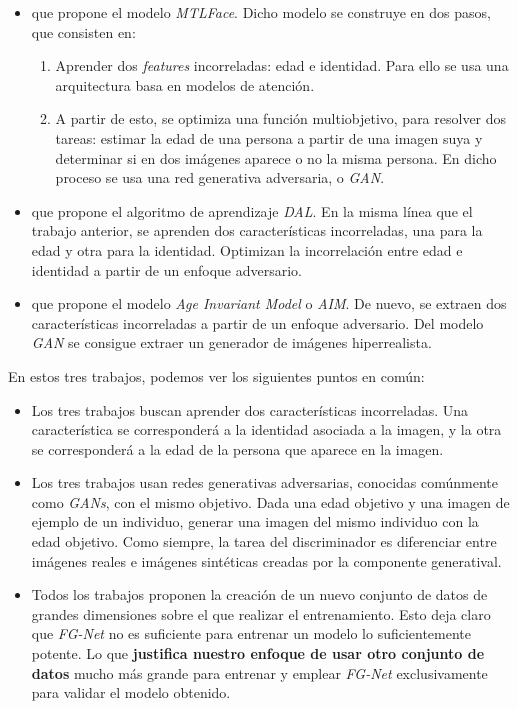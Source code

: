 \begin{itemize}
	\item {} \cite{informatica:best_fgnet_model} que propone el modelo \textit{MTLFace}. Dicho modelo se construye en dos pasos, que consisten en:
	      \begin{enumerate}
		      \item Aprender dos \textit{features} incorreladas: edad e identidad. Para ello se usa una arquitectura basa en modelos de atención.
		      \item A partir de esto, se optimiza una función multiobjetivo, para resolver dos tareas: estimar la edad de una persona a partir de una imagen suya y determinar si en dos imágenes aparece o no la misma persona. En dicho proceso se usa una red generativa adversaria, o \textit{GAN}.
	      \end{enumerate}
	\item {} \cite{informatica:dal} que propone el algoritmo de aprendizaje \textit{DAL}. En la misma línea que el trabajo anterior, se aprenden dos características incorreladas, una para la edad y otra para la identidad. Optimizan la incorrelación entre edad e identidad a partir de un enfoque adversario.
	\item {} \cite{informatica:aim} que propone el modelo \textit{Age Invariant Model} o \textit{AIM}. De nuevo, se extraen dos características incorreladas a partir de un enfoque adversario. Del modelo \textit{GAN} se consigue extraer un generador de imágenes hiperrealista.
\end{itemize}

En estos tres trabajos, podemos ver los siguientes puntos en común:

\begin{itemize}
	\item Los tres trabajos buscan aprender dos características incorreladas. Una característica se corresponderá a la identidad asociada a la imagen, y la otra se corresponderá a la edad de la persona que aparece en la imagen.
	\item Los tres trabajos usan redes generativas adversarias, conocidas comúnmente como \textit{GANs}, con el mismo objetivo. Dada una edad objetivo y una imagen de ejemplo de un individuo, generar una imagen del mismo individuo con la edad objetivo. Como siempre, la tarea del discriminador es diferenciar entre imágenes reales e imágenes sintéticas creadas por la componente generatival.
	\item Todos los trabajos proponen la creación de un nuevo conjunto de datos de grandes dimensiones sobre el que realizar el entrenamiento. Esto deja claro que \textit{FG-Net} no es suficiente para entrenar un modelo lo suficientemente potente. Lo que \textbf{justifica nuestro enfoque de usar otro conjunto de datos} mucho más grande para entrenar y emplear \textit{FG-Net} exclusivamente para validar el modelo obtenido.
\end{itemize}


